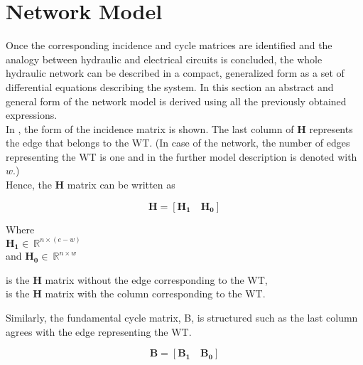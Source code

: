 \section{Network Model}  
\label{ParameterEstimation}
Once the corresponding incidence and cycle matrices are identified and the analogy between hydraulic and electrical circuits is concluded, the whole hydraulic network can be described in a compact, generalized form as a set of differential equations describing the system. In this section an abstract and general form of the network model is derived using all the previously obtained expressions. 
\\
In , the form of the incidence matrix is shown. The last column of $\pmb{H}$ represents the edge that belongs to the WT. (In case of the network, the number of edges representing the WT is one and in the further model description is denoted with $w$.) 
\\
Hence, the $\pmb{H}$ matrix can be written as 

\begin {equation}
\pmb{H} = [\pmb{H_1} \quad \pmb{H_0}]
\label{Hmatrix}
\end{equation}

\begin{minipage}[t]{0.18\textwidth}
Where\\
\hspace*{8mm} $\pmb{H_1} \in \: \mathbb{R}^{n \times (e-w)}$  \\
and \hspace*{0.4mm} $\pmb{H_0} \in \: \mathbb{R}^{n \times w} $ 
\end{minipage}
\begin{minipage}[t]{0.70\textwidth}
\vspace*{2mm}
\hspace*{4mm} is the $\pmb{H}$ matrix without the edge corresponding to the WT,\\
\hspace*{4mm} is the $\pmb{H}$ matrix with the column corresponding to the WT. 
\end{minipage}

Similarly, the fundamental cycle matrix, B, is structured such as the last column agrees with the edge representing the WT.

\begin{equation}
  \pmb{B} = [\pmb{B_1} \quad \pmb{B_0}]
\end{equation} 

